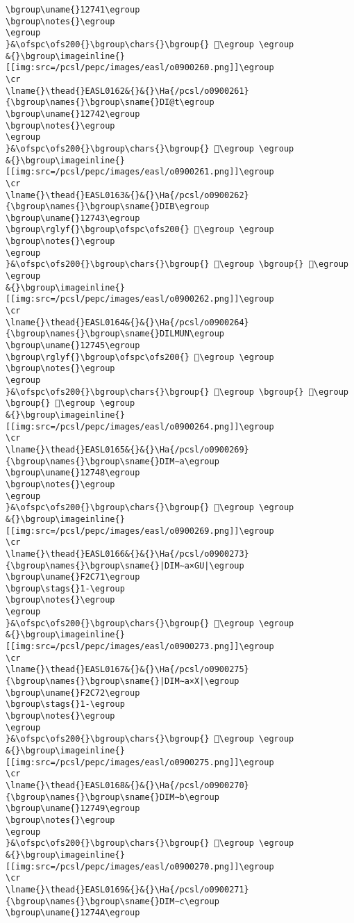 \begin{verbatim}
\bgroup\uname{}12741\egroup
\bgroup\notes{}\egroup
\egroup
}&\ofspc\ofs200{}\bgroup\chars{}\bgroup{} 𒝁\egroup \egroup
&{}\bgroup\imageinline{}[[img:src=/pcsl/pepc/images/easl/o0900260.png]]\egroup
\cr
\lname{}\thead{}EASL0162&{}&{}\Ha{/pcsl/o0900261}{\bgroup\names{}\bgroup\sname{}DI@t\egroup
\bgroup\uname{}12742\egroup
\bgroup\notes{}\egroup
\egroup
}&\ofspc\ofs200{}\bgroup\chars{}\bgroup{} 𒝂\egroup \egroup
&{}\bgroup\imageinline{}[[img:src=/pcsl/pepc/images/easl/o0900261.png]]\egroup
\cr
\lname{}\thead{}EASL0163&{}&{}\Ha{/pcsl/o0900262}{\bgroup\names{}\bgroup\sname{}DIB\egroup
\bgroup\uname{}12743\egroup
\bgroup\rglyf{}\bgroup\ofspc\ofs200{} 𒝃\egroup \egroup
\bgroup\notes{}\egroup
\egroup
}&\ofspc\ofs200{}\bgroup\chars{}\bgroup{} 𒝃\egroup \bgroup{} 𒝄\egroup \egroup
&{}\bgroup\imageinline{}[[img:src=/pcsl/pepc/images/easl/o0900262.png]]\egroup
\cr
\lname{}\thead{}EASL0164&{}&{}\Ha{/pcsl/o0900264}{\bgroup\names{}\bgroup\sname{}DILMUN\egroup
\bgroup\uname{}12745\egroup
\bgroup\rglyf{}\bgroup\ofspc\ofs200{} 𒝅\egroup \egroup
\bgroup\notes{}\egroup
\egroup
}&\ofspc\ofs200{}\bgroup\chars{}\bgroup{} 𒝇\egroup \bgroup{} 𒝅\egroup \bgroup{} 𒝆\egroup \egroup
&{}\bgroup\imageinline{}[[img:src=/pcsl/pepc/images/easl/o0900264.png]]\egroup
\cr
\lname{}\thead{}EASL0165&{}&{}\Ha{/pcsl/o0900269}{\bgroup\names{}\bgroup\sname{}DIM∼a\egroup
\bgroup\uname{}12748\egroup
\bgroup\notes{}\egroup
\egroup
}&\ofspc\ofs200{}\bgroup\chars{}\bgroup{} 𒝈\egroup \egroup
&{}\bgroup\imageinline{}[[img:src=/pcsl/pepc/images/easl/o0900269.png]]\egroup
\cr
\lname{}\thead{}EASL0166&{}&{}\Ha{/pcsl/o0900273}{\bgroup\names{}\bgroup\sname{}|DIM∼a×GU|\egroup
\bgroup\uname{}F2C71\egroup
\bgroup\stags{}1-\egroup
\bgroup\notes{}\egroup
\egroup
}&\ofspc\ofs200{}\bgroup\chars{}\bgroup{} 󲱱\egroup \egroup
&{}\bgroup\imageinline{}[[img:src=/pcsl/pepc/images/easl/o0900273.png]]\egroup
\cr
\lname{}\thead{}EASL0167&{}&{}\Ha{/pcsl/o0900275}{\bgroup\names{}\bgroup\sname{}|DIM∼a×X|\egroup
\bgroup\uname{}F2C72\egroup
\bgroup\stags{}1-\egroup
\bgroup\notes{}\egroup
\egroup
}&\ofspc\ofs200{}\bgroup\chars{}\bgroup{} 󲱲\egroup \egroup
&{}\bgroup\imageinline{}[[img:src=/pcsl/pepc/images/easl/o0900275.png]]\egroup
\cr
\lname{}\thead{}EASL0168&{}&{}\Ha{/pcsl/o0900270}{\bgroup\names{}\bgroup\sname{}DIM∼b\egroup
\bgroup\uname{}12749\egroup
\bgroup\notes{}\egroup
\egroup
}&\ofspc\ofs200{}\bgroup\chars{}\bgroup{} 𒝉\egroup \egroup
&{}\bgroup\imageinline{}[[img:src=/pcsl/pepc/images/easl/o0900270.png]]\egroup
\cr
\lname{}\thead{}EASL0169&{}&{}\Ha{/pcsl/o0900271}{\bgroup\names{}\bgroup\sname{}DIM∼c\egroup
\bgroup\uname{}1274A\egroup

\end{verbatim}
